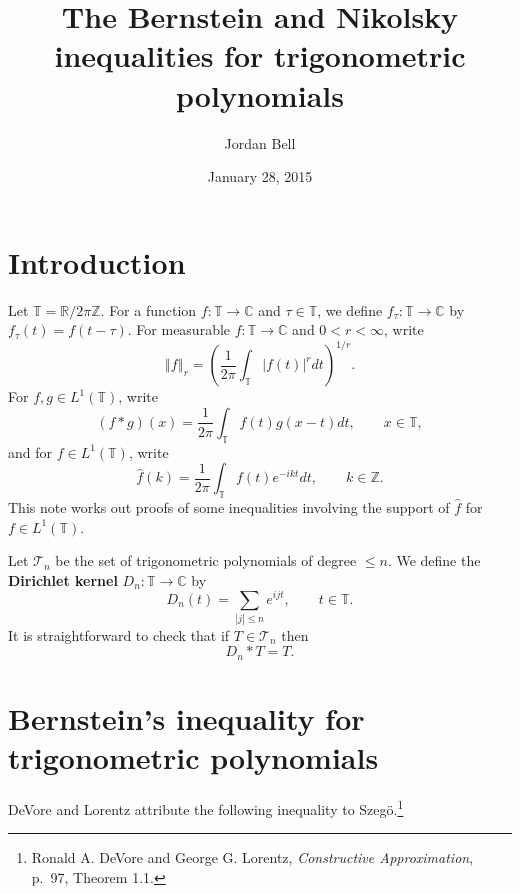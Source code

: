\documentclass{article}
\newcommand{\norm}[1]{\left\Vert #1 \right\Vert}
\theoremstyle{definition}
\theoremstyle{definition}
\begin{document}
\title{The Bernstein and Nikolsky inequalities for trigonometric polynomials}
\author{Jordan Bell}
\date{January 28, 2015}

\maketitle

\section{Introduction}
Let $\mathbb{T}=\mathbb{R}/2\pi \mathbb{Z}$. For a function $f:\mathbb{T} \to \mathbb{C}$ and $\tau \in \mathbb{T}$, we define
$f_\tau:\mathbb{T} \to \mathbb{C}$ by $f_\tau(t)=f(t-\tau)$.
For measurable $f:\mathbb{T} \to \mathbb{C}$ and $0<r<\infty$, write
\[
\norm{f}_r = \left(\frac{1}{2\pi} \int_{\mathbb{T}} |f(t)|^r dt\right)^{1/r}.
\]
For $f,g \in L^1(\mathbb{T})$, write
\[
(f*g)(x) = \frac{1}{2\pi} \int_{\mathbb{T}} f(t)g(x-t) dt, \qquad x \in \mathbb{T},
\]
and for $f \in L^1(\mathbb{T})$, write
\[
\hat{f}(k)=\frac{1}{2\pi} \int_{\mathbb{T}} f(t) e^{-ikt} dt, \qquad k \in \mathbb{Z}.
\]
This note works out proofs of some inequalities involving the support of  $\hat{f}$ for
$f \in L^1(\mathbb{T})$.



Let $\mathscr{T}_n$ be the set of trigonometric polynomials of degree $\leq n$. 
We define the \textbf{Dirichlet kernel} $D_n:\mathbb{T} \to \mathbb{C}$ by
\[
D_n(t) = \sum_{|j| \leq n} e^{ijt}, \qquad t \in \mathbb{T}.
\]
It is straightforward to check that if $T \in \mathscr{T}_n$ then 
\[
D_n * T = T.
\]



\section{Bernstein's inequality for trigonometric polynomials}
DeVore and Lorentz attribute the following inequality to Szeg\"o.\footnote{Ronald A. DeVore and George G. Lorentz,
{\em Constructive Approximation}, p.~97, Theorem 1.1.}
\end{document}
